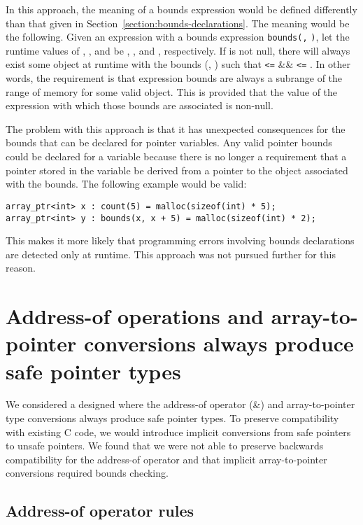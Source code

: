 In this approach, the meaning of a bounds expression would be defined
differently than that given in Section~\ref{section:bounds-declarations}. 
The meaning would be the
following. Given an expression  with a bounds expression
\texttt{bounds(}\texttt{,} \texttt{)}, let the runtime
values of , , and  be , ,
and , respectively. If  is not null, there will
always exist some object at runtime with the bounds (,
) such that  \texttt{\textless{}=}  \&\&
 \texttt{\textless{}=} . In other words, the
requirement is that expression bounds are always a subrange of the range
of memory for some valid object. This is provided that the value of the
expression with which those bounds are associated is non-null.

The problem with this approach is that it has unexpected consequences
for the bounds that can be declared for pointer variables.
Any valid pointer bounds could be declared for a variable because there
is no longer a requirement that a pointer stored in the variable be
derived from a pointer to the object associated with the bounds. The
following example would be valid:

\begin{verbatim}
array_ptr<int> x : count(5) = malloc(sizeof(int) * 5);
array_ptr<int> y : bounds(x, x + 5) = malloc(sizeof(int) * 2);
\end{verbatim}

This makes it more likely that programming errors involving bounds
declarations are detected only at runtime.  This approach was not 
pursued further for this reason.

\section{Address-of operations and array-to-pointer conversions always produce safe pointer types}

We considered a designed where the address-of operator (\&) and
array-to-pointer type conversions always produce safe pointer types. To
preserve compatibility with existing C code, we would introduce implicit
conversions from safe pointers to unsafe pointers. We found that we were
not able to preserve backwards compatibility for the address-of operator
and that implicit array-to-pointer conversions required bounds checking.

\subsection{Address-of operator rules}

